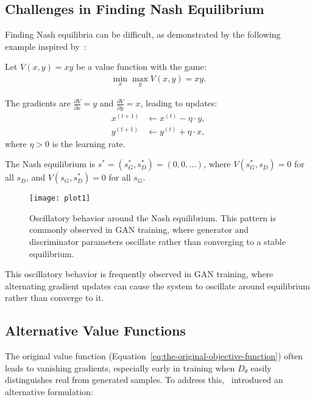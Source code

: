 \subsection{Challenges in Finding Nash Equilibrium}%
\label{sec:difficulty}

Finding Nash equilibria can be difficult, as demonstrated by the following example inspired by~\cite{ref:weng-2017}:

\begin{example}
  Let $V(x, y) = xy$ be a value function with the game:
  \begin{align}
    \min_x \max_y V(x, y) = xy.
  \end{align}

  The gradients are $\frac{\partial V}{\partial x} = y$ and $\frac{\partial V}{\partial y} = x$, leading to updates:
  \begin{align}
    x^{(t+1)} & \gets x^{(t)} - \eta \cdot y, \\
    y^{(t+1)} & \gets y^{(t)} + \eta \cdot x,
  \end{align}
  where $\eta > 0$ is the learning rate.

  The Nash equilibrium is $s^* = (s_G^*, s_D^*) = (0, 0, \dots)$, where $V(s_G^*, s_D) = 0$ for all $s_D$, and $V(s_G, s_D^*) = 0$ for all $s_G$.

  \begin{figure}[H]
    \centering
    \texttt{[image: plot1]}
    \caption{Oscillatory behavior around the Nash equilibrium. This pattern is commonly observed in GAN training, where generator and discriminator parameters oscillate rather than converging to a stable equilibrium.}%
    \label{fig:alternating}
  \end{figure}
\end{example}

This oscillatory behavior is frequently observed in GAN training, where alternating gradient updates can cause the system to oscillate around equilibrium rather than converge to it.

\subsection{Alternative Value Functions}%
\label{sec:two-value}

The original value function (Equation~\ref{eq:the-original-objective-function}) often leads to vanishing gradients, especially early in training when $D_\theta$ easily distinguishes real from generated samples. To address this,~\cite{ref:goodfellow-original} introduced an alternative formulation:

